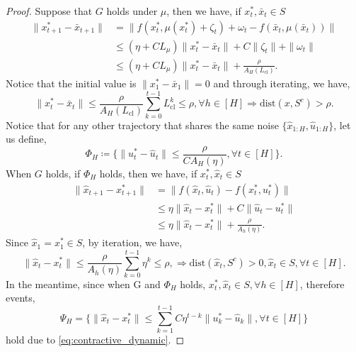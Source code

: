 \documentclass{article}
\begin{document}
\begin{proof}
Suppose that $G$ holds under $\mu$, then we have, if $x_t^*, \bar x_t\in S$
\begin{align*}
    \|x_{t+1}^*-\bar x_{t+1}\|&=\|f(x_t^*,\mu(x_t^*)+\zeta_t)+\omega_t-f(\bar x_t, \mu(\bar x_t))\|\\
    &\leq (\eta+CL_\mu)\|x_t^*-\bar x_t\|+C\|\zeta_t\|+\|\omega_t\|\\
    &\leq (\eta+CL_\mu)\|x_t^*-\bar x_t\|+\frac{\rho}{A_H(L_{\text{cl}})}.
\end{align*}
Notice that the initial value is $\|x_1^*-\bar x_1\|=0$ and through iterating, we have,
\begin{equation*}
    \|x_{t}^*-\bar x_t\|\leq \frac{\rho}{A_H(L_{\text{cl}})}\sum_{k=0}^{t-1}L_{\text{cl}}^k \leq \rho,\forall h\in[ H]\Rightarrow \text{dist}(x, S^c)> \rho.
\end{equation*}
Notice that for any other trajectory that shares the same noise $\{\hat x_{1:H}, \hat u_{1:H}\}$,  let us define,
\begin{equation*}
    \Phi_H\coloneqq \{\|u_t^*-\hat u_t\|\leq \frac{\rho}{CA_H(\eta)},\forall t\in[H]\}.
\end{equation*}
When $G$ holds, if $\Phi_H$ holds, then we have, if $x_t^*, \hat x_t\in S$
\begin{equation}\label{eq:contractive_dynamic}
    \begin{aligned}
            \|\hat x_{t+1}-x_{t+1}^*\|&=\|f(\hat x_t, \hat u_t)-f(x_t^*, u_t^*)\|\\&\leq \eta \|\hat x_t -x_t^*\|+C\|\hat u_t-u_t^*\|\\
    &\leq \eta\|\hat x_t-x_t^*\|+\frac{\rho}{A_h(\eta)}.
    \end{aligned}
\end{equation}
Since $\hat x_1=x_1^*\in S$, by iteration, we have,
\begin{equation*}
    \|\hat x_{t}-x_t^*\|\leq \frac{\rho}{A_h(\eta)}\sum_{k=0}^{t-1}\eta^k\leq \rho, \Rightarrow \text{dist}(\hat x_t, S^c)>0, \hat x_t\in S,\forall t\in [H].
\end{equation*}
In the meantime, since when G and $\Phi_H$ holds, $x_t^*, \hat x_t\in S,\forall h\in [H]$, therefore events,
\begin{equation*}
    \Psi_H=\{\|\hat x_t-x_t^*\|\leq \sum_{k=1}^{t-1} C\eta^{t-k}\|u_k^*-\hat u_k\|,\forall t\in [H]\}
\end{equation*}
hold due to \cref{eq:contractive_dynamic}.


\end{proof}
\end{document}
